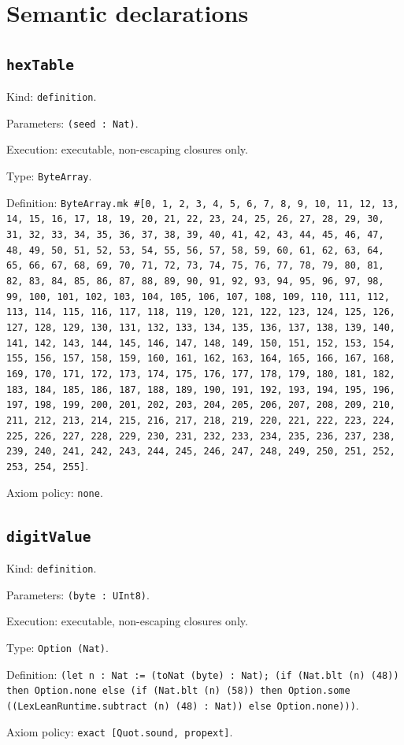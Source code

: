 \documentclass[11pt]{article}
\begin{document}
\section*{Semantic declarations}
\subsection*{\texttt{hexTable}}
\noindent Kind: \texttt{definition}.\par
\noindent Parameters: \texttt{(seed : Nat)}.\par
\noindent Execution: executable, non-escaping closures only.\par
\noindent Type: \texttt{ByteArray}.\par
\noindent Definition: \texttt{ByteArray.mk \#[0, 1, 2, 3, 4, 5, 6, 7, 8, 9, 10, 11, 12, 13, 14, 15, 16, 17, 18, 19, 20, 21, 22, 23, 24, 25, 26, 27, 28, 29, 30, 31, 32, 33, 34, 35, 36, 37, 38, 39, 40, 41, 42, 43, 44, 45, 46, 47, 48, 49, 50, 51, 52, 53, 54, 55, 56, 57, 58, 59, 60, 61, 62, 63, 64, 65, 66, 67, 68, 69, 70, 71, 72, 73, 74, 75, 76, 77, 78, 79, 80, 81, 82, 83, 84, 85, 86, 87, 88, 89, 90, 91, 92, 93, 94, 95, 96, 97, 98, 99, 100, 101, 102, 103, 104, 105, 106, 107, 108, 109, 110, 111, 112, 113, 114, 115, 116, 117, 118, 119, 120, 121, 122, 123, 124, 125, 126, 127, 128, 129, 130, 131, 132, 133, 134, 135, 136, 137, 138, 139, 140, 141, 142, 143, 144, 145, 146, 147, 148, 149, 150, 151, 152, 153, 154, 155, 156, 157, 158, 159, 160, 161, 162, 163, 164, 165, 166, 167, 168, 169, 170, 171, 172, 173, 174, 175, 176, 177, 178, 179, 180, 181, 182, 183, 184, 185, 186, 187, 188, 189, 190, 191, 192, 193, 194, 195, 196, 197, 198, 199, 200, 201, 202, 203, 204, 205, 206, 207, 208, 209, 210, 211, 212, 213, 214, 215, 216, 217, 218, 219, 220, 221, 222, 223, 224, 225, 226, 227, 228, 229, 230, 231, 232, 233, 234, 235, 236, 237, 238, 239, 240, 241, 242, 243, 244, 245, 246, 247, 248, 249, 250, 251, 252, 253, 254, 255]}.\par
\noindent Axiom policy: \texttt{none}.\par
\subsection*{\texttt{digitValue}}
\noindent Kind: \texttt{definition}.\par
\noindent Parameters: \texttt{(byte : UInt8)}.\par
\noindent Execution: executable, non-escaping closures only.\par
\noindent Type: \texttt{Option (Nat)}.\par
\noindent Definition: \texttt{(let n : Nat := (toNat (byte) : Nat); (if (Nat.blt (n) (48)) then Option.none else (if (Nat.blt (n) (58)) then Option.some ((LexLeanRuntime.subtract (n) (48) : Nat)) else Option.none)))}.\par
\noindent Axiom policy: \texttt{exact [Quot.sound, propext]}.\par
\end{document}
